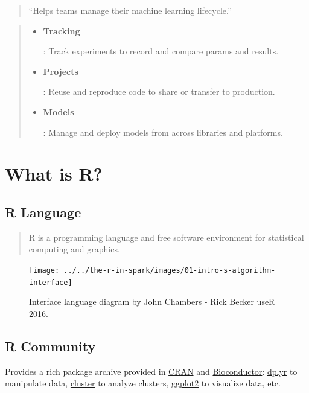 \documentclass[]{article}
\begin{document}
\begin{quote}
``Helps teams manage their machine learning lifecycle.''
\end{quote}

\begin{quote}
\begin{itemize}
\item
  \textbf{Tracking}

  : Track experiments to record and compare params and results.
\item
  \textbf{Projects}

  : Reuse and reproduce code to share or transfer to production.
\item
  \textbf{Models}

  : Manage and deploy models from across libraries and platforms.
\end{itemize}
\end{quote}

\hypertarget{what-is-r}{%
\section{What is R?}\label{what-is-r}}

\hypertarget{r-language}{%
\subsection{R Language}\label{r-language}}

\begin{quote}
R is a programming language and free software environment for
statistical computing and graphics.
\end{quote}

\begin{figure}

{\centering \texttt{[image: ../../the-r-in-spark/images/01-intro-s-algorithm-interface]} 

}

\caption{Interface language diagram by John Chambers - Rick Becker useR 2016.}\label{fig:unnamed-chunk-1}
\end{figure}

\hypertarget{r-community}{%
\subsection{R Community}\label{r-community}}

Provides a rich package archive provided in
\href{https://cran.r-project.org/}{CRAN} and
\href{https://www.bioconductor.org/}{Bioconductor}:
\href{https://CRAN.R-project.org/package=dplyr}{dplyr} to manipulate
data, \href{https://CRAN.R-project.org/package=cluster}{cluster} to
analyze clusters,
\href{https://CRAN.R-project.org/package=ggplot2}{ggplot2} to visualize
data, etc.
\end{document}
